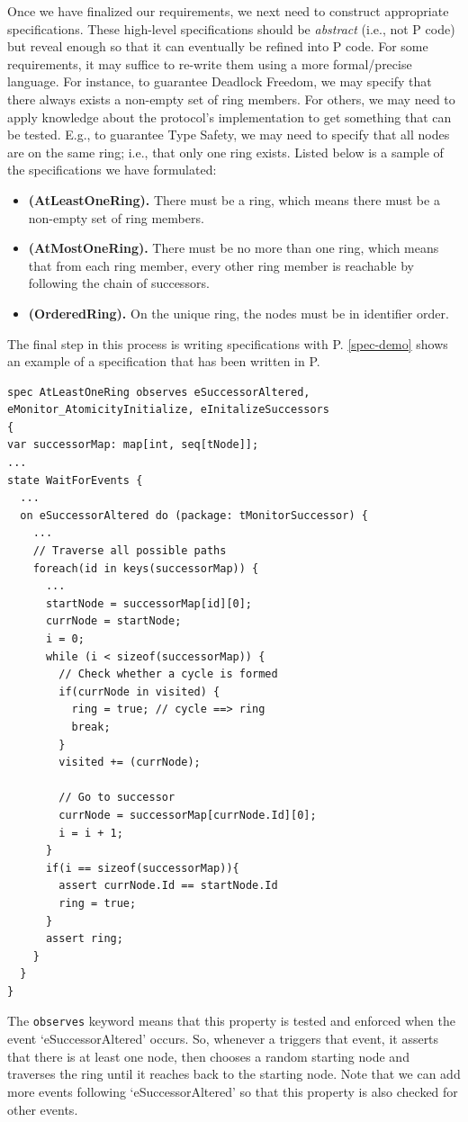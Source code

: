 \documentclass[conference]{IEEEtran}
\begin{document}
Once we have finalized our requirements, we next need to construct appropriate specifications. These high-level specifications should be \textit{abstract} (i.e., not P code) but reveal enough so that it can eventually be refined into P code. For some requirements, it may suffice to re-write them using a more formal/precise language. For instance, to guarantee Deadlock Freedom, we may specify that there always exists a non-empty set of ring members. For others, we may need to apply knowledge about the protocol's implementation to get something that can be tested. E.g., to guarantee Type Safety, we may need to specify that all nodes are on the same ring; i.e., that only one ring exists. Listed below is a sample of the specifications we have formulated:
\begin{itemize}
    \item \textbf{(AtLeastOneRing).} There must be a ring, which means there must be a non-empty set of ring members.
    \item \textbf{(AtMostOneRing).} There must be no more than one ring, which means that from each ring member, every other ring member is reachable by following the chain of successors.
    \item \textbf{(OrderedRing).} On the unique ring, the nodes must be in identifier order.
\end{itemize}

The final step in this process is writing specifications with P. \autoref{spec-demo} shows an example of a specification that has been written in P.
\begin{lstlisting}[caption=An example specification for Chord in P,label=spec-demo]
spec AtLeastOneRing observes eSuccessorAltered, eMonitor_AtomicityInitialize, eInitalizeSuccessors
{
var successorMap: map[int, seq[tNode]];
...
state WaitForEvents {
  ...
  on eSuccessorAltered do (package: tMonitorSuccessor) {    
    ...
    // Traverse all possible paths
    foreach(id in keys(successorMap)) {
      ...
      startNode = successorMap[id][0];
      currNode = startNode;
      i = 0;
      while (i < sizeof(successorMap)) {
        // Check whether a cycle is formed
		if(currNode in visited) {
          ring = true; // cycle ==> ring
          break;
        }
        visited += (currNode);

        // Go to successor
        currNode = successorMap[currNode.Id][0];
        i = i + 1;
      }
      if(i == sizeof(successorMap)){
        assert currNode.Id == startNode.Id
        ring = true;
      }
      assert ring;
    }
  }
}
\end{lstlisting}
The \verb|observes| keyword means that this property is tested and enforced when the event `eSuccessorAltered' occurs. So, whenever a triggers that event, it asserts that there is at least one node, then chooses a random starting node and traverses the ring until it reaches back to the starting node. Note that we can add more events following `eSuccessorAltered' so that this property is also checked for other events.
\end{document}
